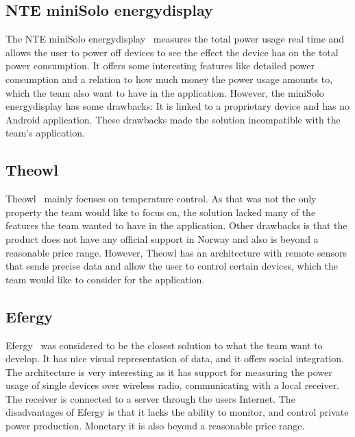 \subsection{NTE miniSolo energydisplay}

The NTE miniSolo energydisplay~\cite{nte} measures the total power usage real time and allows the user to power off devices to see the effect the device has on the total power consumption. It offers some interesting features like detailed power consumption and a relation to how much money the power usage amounts to, which the team also want to have in the application. However, the miniSolo energydisplay has some drawbacks: It is linked to a proprietary device and has no Android application. These drawbacks made the solution incompatible with the team's application.



\subsection{Theowl}

Theowl~\cite{theowl} mainly focuses on temperature control. 
As that was not the only property the team would like to focus on, the solution lacked many of the features the team wanted to have in the application. Other drawbacks is that the product does not have any official support in Norway and also is beyond a reasonable price range. However, Theowl has an architecture with remote sensors that sends precise data and allow the user to control certain devices, which the team would like to consider for the application.


\subsection{Efergy}

Efergy~\cite{efergy} was considered to be the closest solution to what the team want to develop. It has nice visual representation of data, and it offers social integration. The architecture is very interesting as it has support for measuring the power usage of single devices over wireless radio, communicating with a local receiver. The receiver is connected to a server through the users Internet. The disadvantages of Efergy is that it lacks the ability to monitor, and control private power production. Monetary it is also beyond a reasonable price range.


